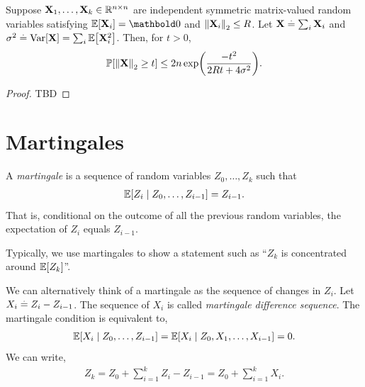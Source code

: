 \begin{thm} Suppose $\mathbf{X}_1, \dots, \mathbf{X}_k \in \mathbb{R}^{n \times n}$ are independent symmetric matrix-valued random variables satisfying $\E{\rX_i} = \mZero$ and $\left\| \mathbf{X}_i \right\|_2 \leq R$. Let $\mathbf{X} \overset{.}{=} \sum_i \mathbf{X}_i$ and $\sigma^2 \defeq \Var{\rX} = \sum_i \E{\rX_i^2}$. Then, for $t > 0$, \begin{align}
    \Pr{\norm{\rX}_2 \geq t} \leq 2 n \exp\parentheses*{\frac{-t^2}{2Rt + 4\sigma^2}}.
\end{align}
\end{thm}
\begin{proof}
TBD
\end{proof}

\section{Martingales}

\begin{defn}[Martingale] A \emph{martingale} is a sequence of random variables $Z_0, \dots, Z_k$ such that \begin{align}
    \E{Z_i \mid Z_0, \dots, Z_{i-1}} = Z_{i-1}.
\end{align} That is, conditional on the outcome of all the previous random variables, the expectation of $Z_i$ equals $Z_{i-1}$.%
\end{defn} Typically, we use martingales to show a statement such as ``$Z_k$ is concentrated around $\E{Z_k}$''.

We can alternatively think of a martingale as the sequence of changes in $Z_i$. Let $X_i \overset{.}{=} Z_i - Z_{i-1}$. The sequence of $X_i$ is called \emph{martingale difference sequence}. The martingale condition is equivalent to, \begin{align}
    \E{X_i \mid Z_0, \dots, Z_{i-1}} = \E{X_i \mid Z_0, X_1, \dots, X_{i-1}} = 0.
\end{align} We can write, \begin{align}
    Z_k = Z_0 + \sum_{i=1}^k Z_i - Z_{i-1} = Z_0 + \sum_{i=1}^k X_i.
\end{align}